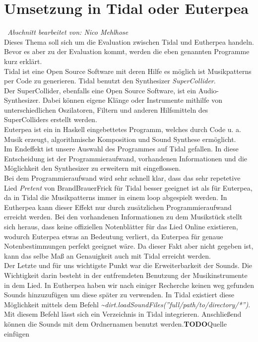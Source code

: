 \documentclass[
10pt, %
a4paper, %
oneside, %
headinclude,footinclude, %
BCOR5mm, %
]{scrartcl}
\begin{document}
\section{Umsetzung in Tidal oder Euterpea}\
\textit{Abschnitt bearbeitet von: Nico Mehlhose}\\

\noindent Dieses Thema soll sich um die Evaluation zwischen Tidal und Eutherpea handeln. Bevor es aber zu der Evaluation kommt, werden die eben genannten
Programme kurz erklärt.\\
Tidal ist eine Open Source Software mit deren Hilfe es möglich ist Musikpatterns per Code zu generieren. Tidal benutzt den Synthesizer \textit{SuperCollider}.\cite{Tidal}\\
Der SuperCollider, ebenfalls eine Open Source Software, ist ein Audio-Synthesizer. Dabei können eigene Klänge oder Instrumente mithilfe von unterschiedlichen Oszilatoren, Filtern
und anderen Hilfsmitteln des SuperColliders erstellt werden. \cite{SC}\\
Euterpea ist ein in Haskell eingebettetes Programm, welches durch Code u. a. Musik erzeugt, algorithmische Komposition und Sound Synthese ermöglicht.\cite{Euterpea}\\
Im Endeffekt ist unsere Auswahl des Programmes auf Tidal gefallen. In diese Entscheidung ist der Programmieraufwand, vorhandenen Informationen
und die Möglichkeit den Synthesizer zu erweitern mit eingeflossen.\\
Bei dem Programmieraufwand wird sehr schnell klar, dass das sehr repetetive Lied \textit{Pretent} von BrandBrauerFrick für Tidal besser geeignet ist als für Euterpea, da in Tidal die Musikpatterns immer in einem loop abgespielt werden. In Eutherpea kann dieser Effekt nur durch zusätzlichen Programmieraufwand erreicht werden. Bei den vorhandenen Informationen zu dem Musikstück stellt sich heraus, dass keine offiziellen Notenblätter für das Lied Online existieren, wodurch Euterpea etwas an Bedeutung verliert, da Euterpea für genaue Notenbestimmungen perfekt geeignet wäre. Da dieser Fakt aber nicht gegeben ist, kann das selbe Maß an Genauigkeit auch mit Tidal erreicht werden.\\
Der Letzte und für uns wichtigste Punkt war die Erweiterbarkeit der Sounds. Die Wichtigkeit darin besteht in der entfremdeten Benutzung der Musikinstrumente in dem Lied.
In Eutherpea haben wir nach einiger Recherche keinen weg gefunden Sounds hinzuzufügen um diese später zu verwenden. In Tidal existiert diese Möglichkeit mittels
dem Befehl \textit{\textasciitilde dirt.loadSoundFiles(''full/path/to/directory/*'')}. Mit diesem Befehl lässt sich ein Verzeichnis in Tidal integrieren. Anschließend können die Sounds mit dem Ordnernamen benutzt werden.{\color{red}\textbf{TODO}}Quelle einfügen
\end{document}
